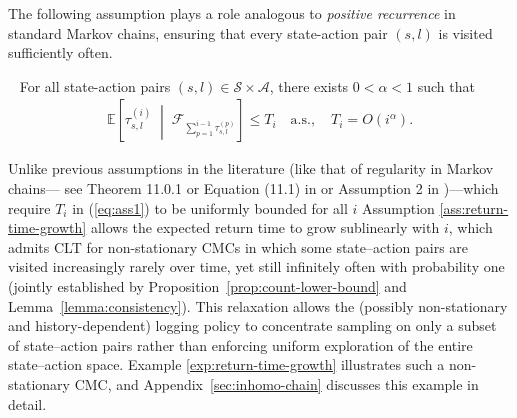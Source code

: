 \documentclass[twoside,11pt]{article}
\newcommand{\pow}[1]{^{(#1)}}%
\numberwithin{equation}{section}
\begin{document}
The following assumption plays a role analogous to \textit{positive recurrence} in standard Markov chains, ensuring that every state-action pair $(s,l)$ is visited sufficiently often. 
\begin{assumption}~\label{ass:return-time-growth}
For all state-action pairs $(s,l) \in \mathcal{S} \times \mathcal{A}$, there exists $0< \alpha < 1$ such that
\begin{align}
\label{eq:ass1}
    \mathbb{E} \left[\tau^{(i)}_{s,l} \;\middle|\;
\mathcal{F}_{\sum_{p=1}^{i-1}\tau^{(p)}_{s,l}}\right] \leq T_i \quad \text{a.s.}, \quad T_i = O(i^{\alpha}).
\end{align}
\end{assumption}
Unlike previous assumptions in the literature (like that of regularity in Markov chains--- see Theorem 11.0.1 or Equation (11.1) in \cite{meyn_markov_2012} or Assumption 2 in \cite{banerjee2025off})---which require $T_i$ in (\ref{eq:ass1}) to be uniformly bounded for all $i$ Assumption \ref{ass:return-time-growth} allows the expected return time to grow sublinearly with $i$, which admits CLT for non-stationary CMCs in which some state–action pairs are visited increasingly rarely over time, yet still infinitely often with probability one (jointly established by Proposition~\ref{prop:count-lower-bound} and Lemma~\ref{lemma:consistency}).
This relaxation allows the (possibly non-stationary and history-dependent) logging policy to concentrate sampling on only a subset of state–action pairs rather than enforcing uniform exploration of the entire state–action space. 
Example \ref{exp:return-time-growth} illustrates such a non-stationary CMC, and Appendix~\ref{sec:inhomo-chain} discusses this example in detail.
\end{document}
